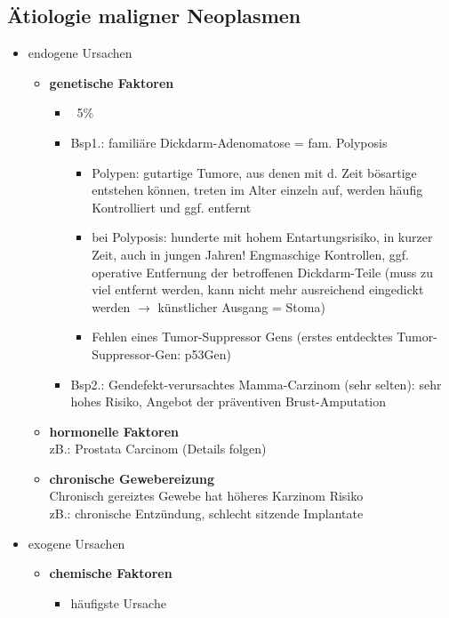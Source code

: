	\subsection{Ätiologie maligner Neoplasmen}
		\begin{itemize}
			\item endogene Ursachen
				\begin{itemize}
					\item \textbf{genetische Faktoren}
						\begin{itemize}
							\item ~5\% 
							\item Bsp1.: familiäre Dickdarm-Adenomatose = fam. Polyposis
								\begin{itemize}
									\item Polypen: gutartige Tumore, aus denen mit d. Zeit bösartige entstehen können, treten im Alter einzeln auf, werden häufig Kontrolliert und ggf. entfernt
									\item bei Polyposis: hunderte mit hohem Entartungsrisiko, in kurzer Zeit, auch in jungen Jahren! Engmaschige Kontrollen, ggf. operative Entfernung der betroffenen Dickdarm-Teile (muss zu viel entfernt werden, kann nicht mehr ausreichend eingedickt werden $\rightarrow$ künstlicher Ausgang = Stoma) 
									\item Fehlen eines Tumor-Suppressor Gens (erstes entdecktes Tumor-Suppressor-Gen: p53Gen)
								\end{itemize}
							\item Bsp2.: Gendefekt-verursachtes Mamma-Carzinom (sehr selten): sehr hohes Risiko, Angebot der präventiven Brust-Amputation
						\end{itemize}
					\item  \textbf{hormonelle Faktoren} \\
						zB.: Prostata Carcinom (Details folgen)						
					\item	\textbf{chronische Gewebereizung} \\
						Chronisch gereiztes Gewebe hat höheres Karzinom Risiko\\
						zB.: chronische Entzündung, schlecht sitzende Implantate 
				\end{itemize}
			\item exogene Ursachen
				\begin{itemize}
					\item \textbf{chemische Faktoren}
						\begin{itemize}
							\item häufigste Ursache

\end{itemize}
\end{itemize}
\end{itemize}
